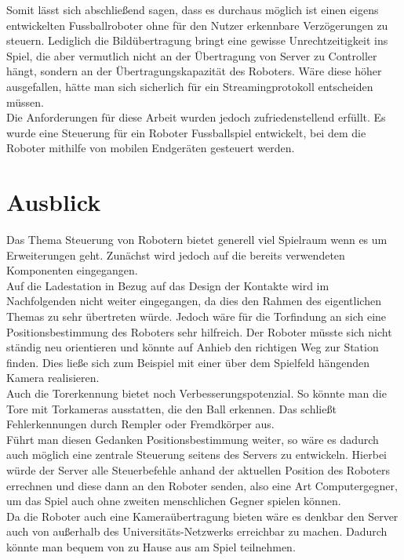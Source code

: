 Somit lässt sich abschließend sagen, dass es durchaus möglich ist einen eigens entwickelten Fussballroboter ohne für den Nutzer erkennbare Verzögerungen zu steuern. Lediglich die Bildübertragung bringt eine gewisse Unrechtzeitigkeit ins Spiel, die aber vermutlich nicht an der Übertragung von Server zu Controller hängt, sondern an der Übertragungskapazität des Roboters. Wäre diese höher ausgefallen, hätte man sich sicherlich für ein Streamingprotokoll entscheiden müssen.\\
Die Anforderungen für diese Arbeit wurden jedoch zufriedenstellend erfüllt. Es wurde eine Steuerung für ein Roboter Fussballspiel entwickelt, bei dem die Roboter mithilfe von mobilen Endgeräten gesteuert werden.





\section{Ausblick}

Das Thema Steuerung von Robotern bietet generell viel Spielraum wenn es um Erweiterungen geht. Zunächst wird jedoch auf die bereits verwendeten Komponenten eingegangen.\\
Auf die Ladestation in Bezug auf das Design der Kontakte wird im Nachfolgenden nicht weiter eingegangen, da dies den Rahmen des eigentlichen Themas zu sehr übertreten würde. Jedoch wäre für die Torfindung an sich eine Positionsbestimmung des Roboters sehr hilfreich. Der Roboter müsste sich nicht ständig neu orientieren und könnte auf Anhieb den richtigen Weg zur Station finden. Dies ließe sich zum Beispiel mit einer über dem Spielfeld hängenden Kamera realisieren.  \\
Auch die Torerkennung bietet noch Verbesserungspotenzial. So könnte man die Tore mit Torkameras ausstatten, die den Ball erkennen. Das schließt Fehlerkennungen durch Rempler oder Fremdkörper aus. \\

Führt man diesen Gedanken Positionsbestimmung weiter, so wäre es dadurch auch möglich eine zentrale Steuerung seitens des Servers zu entwickeln. Hierbei würde der Server alle Steuerbefehle anhand der aktuellen Position des Roboters errechnen und diese dann an den Roboter senden, also eine Art Computergegner, um das Spiel auch ohne zweiten menschlichen Gegner spielen können. \\
Da die Roboter auch eine Kameraübertragung bieten wäre es denkbar den Server auch von außerhalb des Universitäts-Netzwerks erreichbar zu machen. Dadurch könnte man bequem von zu Hause aus am Spiel teilnehmen.